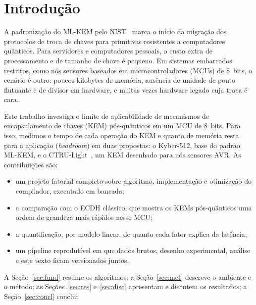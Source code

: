 \documentclass[acmsmall,nonacm,language=english,language=brazilian]{acmart}
\begin{document}
\maketitle

\section{Introdução}
\label{sec:intro}
A padronização do ML-KEM pelo NIST~\citep{fips203} marca o início da migração
dos protocolos de troca de chaves para primitivas resistentes a computadores
quânticos. Para servidores e computadores pessoais, o custo extra de
processamento e de tamanho de chave é pequeno. Em sistemas embarcados
restritos, como nós sensores baseados em microcontroladores (MCUs) de 8~bits,
o cenário é outro: poucos kilobytes de memória, ausência de unidade de ponto
flutuante e de divisor em hardware, e muitas vezes hardware legado cuja troca
é cara.

Este trabalho investiga o limite de aplicabilidade de mecanismos
de encapsulamento de chaves (KEM) pós-quânticos em um MCU de 8~bits.
Para isso, medimos o tempo de cada operação do KEM e quanto de memória resta
para a aplicação (\emph{headroom}) em duas propostas: o Kyber-512, base do
padrão ML-KEM, e o CTRU-Light~\citep{ctrulight2026}, um KEM desenhado para
nós sensores AVR. As contribuições são:
\begin{itemize}
  \item um projeto fatorial completo sobre algoritmo, implementação e
        otimização do compilador, executado em bancada;
  \item a comparação com o ECDH clássico, que mostra os KEMs pós-quânticos
        uma ordem de grandeza mais rápidos nesse MCU;
  \item a quantificação, por modelo linear, de quanto cada fator explica da
        latência;
  \item um pipeline reprodutível em que dados brutos, desenho experimental,
        análise e este texto ficam versionados juntos.
\end{itemize}

A Seção~\ref{sec:fund} resume os algoritmos; a Seção~\ref{sec:met} descreve o
ambiente e o método; as Seções~\ref{sec:res} e~\ref{sec:disc} apresentam e
discutem os resultados; a Seção~\ref{sec:concl} conclui.
\end{document}
